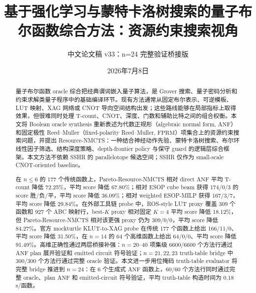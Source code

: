 \documentclass[UTF8,fontset=macnew,11pt]{ctexart}
\title{基于强化学习与蒙特卡洛树搜索的量子布尔函数综合方法：资源约束搜索视角}
\author{中文论文稿 v33：n=24 完整验证桥接版}
\date{2026年7月8日}
\newcommand{\method}{Resource-NMCTS}
\newcommand{\anf}{\ensuremath{\mathrm{ANF}}}
\newcommand{\fprm}{\ensuremath{\mathrm{FPRM}}}
\begin{document}
\pagestyle{plain}
\maketitle

\begin{abstract}
量子布尔函数 oracle 综合把经典谓词嵌入量子算法，是 Grover 搜索、量子密码分析和约束求解类量子程序中的基础编译环节。现有方法通常从固定布尔表示、可逆模板、LUT 映射、XAG 网络或 CNOT 导向空间结构出发；这些路线能够在局部指标上取得效果，但很难同时处理 T-count、CNOT、深度、门数和辅助比特之间的组合权衡。本文将 Boolean oracle synthesis 重新表述为代数正规形（algebraic normal form, \anf{}）和固定极性 Reed--Muller（fixed-polarity Reed--Muller, \fprm{}）项集合上的资源约束搜索问题，并提出 \method{}：一种结合神经动作先验、蒙特卡洛树搜索、布尔环线性因子筛选、结构深度策略、depth-frontier policy 与保守 guard 的逻辑层综合框架。本文方法不依赖 SSHR 的 parallelotope 候选空间；SSHR 仅作为 small-scale CNOT-oriented baseline。

在 $n\leq6$ 的 177 个传统函数上，Pareto-\method{} 相对 direct \anf{} 平均 T-count 降低 72.25\%，平均 score 降低 67.80\%；相对 ESOP cube beam 获得 174/0/3 的 score 胜/负/平，平均 score 降低 36.09\%；相对 weighted ESOP-MILP 获得 167/3/7，平均 score 降低 29.84\%。在外部工具链 probe 中，ROS-style LUT proxy 覆盖 309 个函数和 927 个 ABC 映射行，best-$K$ proxy 相对固定 $K=4$ 平均 score 降低 18.12\%，但 Pareto-\method{} 相对该更强 proxy 仍为 309/0/0，平均 score 降低 84.27\%。官方 mockturtle KLUT-to-XAG probe 在传统 177 个函数上给出 166/11/0、平均 score 降低 31.50\%，在 $n=14$ 的 64 个高维函数上给出 64/0/0、平均 score 降低 91.49\%。高维正确性通过两层桥接补强：$n=20$--$40$ 项集级 6600/6600 个方法行通过 \anf{} plan 展开验证和 emitted circuit 符号验证；$n=21,22,23$ truth-table bridge 中 300/300 个方法行通过完整 oracle 验证。本文进一步用位掩码 truth-table evaluator 将完整 bridge 推进到 $n=24$：在 6 个生成式 \anf{} 函数上，60/60 个方法行同时通过完整 oracle、plan \anf{} 和 emitted-circuit 符号验证，平均 truth-table 构造时间为 0.18 s/函数。


\end{abstract}
\end{document}
